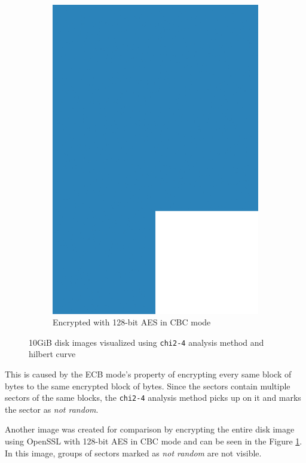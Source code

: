 \documentclass[
  digital, %
  color,   %
  oneside, %
  lof,     %
  nolot,     %
]{fithesis4}
\begin{document}
\begin{figure}
\begin{subfigure}[t]{.32\textwidth}
        \includegraphics[width=\textwidth,interpolate=false]{figures/ubnt-test-aes-128-cbc-chi2-4-hilbert.png}
        \caption{Encrypted with 128-bit AES in CBC mode}
        \label{fig:bad-enc-good-enc}
    \end{subfigure}
    \caption{10GiB disk images visualized using \texttt{chi2-4} analysis method and hilbert curve}
    \label{fig:bad-enc-fig}
\end{figure}

This is caused by the ECB mode's property of encrypting every same block of bytes to the same encrypted block of bytes.
Since the sectors contain multiple sectors of the same blocks, the \texttt{chi2-4} analysis method picks up on it and marks the sector as \emph{not random}.

Another image was created for comparison by encrypting the entire disk image using OpenSSL with 128-bit AES in CBC mode and can be seen in the Figure \ref{fig:bad-enc-good-enc}.
In this image, groups of sectors marked as \emph{not random} are not visible.
\end{document}
